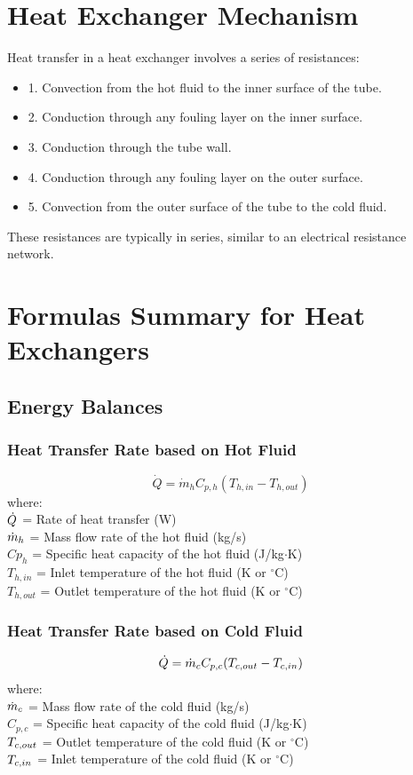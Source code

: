 \section{Heat Exchanger Mechanism}
Heat transfer in a heat exchanger involves a series of resistances:
\begin{itemize}
    \item 1.  Convection from the hot fluid to the inner surface of the tube.
    \item 2.  Conduction through any fouling layer on the inner surface.
    \item 3.  Conduction through the tube wall.
    \item 4.  Conduction through any fouling layer on the outer surface.
    \item 5.  Convection from the outer surface of the tube to the cold fluid.
\end{itemize}


These resistances are typically in series, similar to an electrical resistance network.

\section{Formulas Summary for Heat Exchangers}

\subsection{Energy Balances}
\subsubsection*{Heat Transfer Rate based on Hot Fluid}
\begin{equation}
    \dot{Q} = \dot{m}_h C_{p,h} (T_{h,in} - T_{h,out})
\end{equation}
where: \\
$\dot{Q}$ = Rate of heat transfer (W) \\
$\dot{m}_h$ = Mass flow rate of the hot fluid (kg/s) \\
$Cp_{h}$ = Specific heat capacity of the hot fluid (J/kg$\cdot$K) \\
$T_{h,in}$ = Inlet temperature of the hot fluid (K or $^\circ$C) \\
$T_{h,out}$ = Outlet temperature of the hot fluid (K or $^\circ$C)

\subsubsection*{Heat Transfer Rate based on Cold Fluid}
\begin{equation}
    \dot{Q} = \dot{m}_c C_{p,c} (T_{c,out} - T_{c,in})
\end{equation}
where: \\
$\dot{m}_c$ = Mass flow rate of the cold fluid (kg/s) \\
$C_{p,c}$ = Specific heat capacity of the cold fluid (J/kg$\cdot$K) \\
$T_{c,out}$ = Outlet temperature of the cold fluid (K or $^\circ$C) \\
$T_{c,in}$ = Inlet temperature of the cold fluid (K or $^\circ$C)

